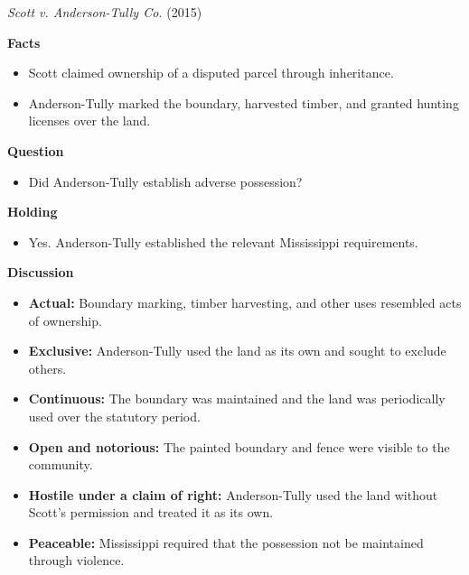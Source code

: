 \documentclass[11pt]{tex/lawoutline}
\begin{document}
\casebox
{\textit{Scott v. Anderson-Tully Co.} (2015)}
{}
{
\textbf{Facts}
\begin{itemize}
    \item Scott claimed ownership of a disputed parcel through inheritance.
    \item Anderson-Tully marked the boundary, harvested timber, and granted hunting licenses over the land.
\end{itemize}

\textbf{Question}
\begin{itemize}
    \item Did Anderson-Tully establish adverse possession?
\end{itemize}

\textbf{Holding}
\begin{itemize}
    \item Yes. Anderson-Tully established the relevant Mississippi requirements.
\end{itemize}

\textbf{Discussion}
\begin{itemize}
    \item \textbf{Actual:} Boundary marking, timber harvesting, and other uses resembled acts of ownership.
    \item \textbf{Exclusive:} Anderson-Tully used the land as its own and sought to exclude others.
    \item \textbf{Continuous:} The boundary was maintained and the land was periodically used over the statutory period.
    \item \textbf{Open and notorious:} The painted boundary and fence were visible to the community.
    \item \textbf{Hostile under a claim of right:} Anderson-Tully used the land without Scott's permission and treated it as its own.
    \item \textbf{Peaceable:} Mississippi required that the possession not be maintained through violence.
\end{itemize}
}

\end{document}
